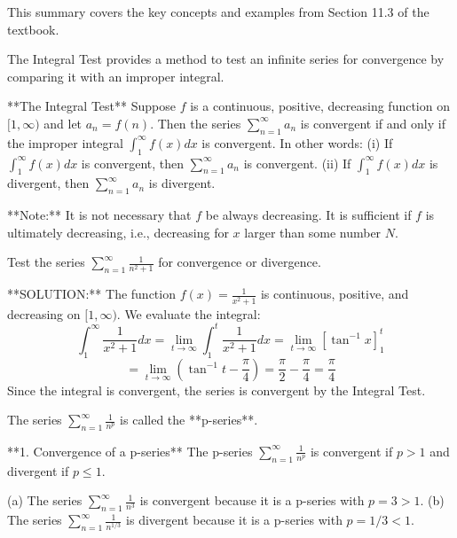 \documentclass[10pt]{book}
\begin{document}

This summary covers the key concepts and examples from Section 11.3 of the textbook.


The Integral Test provides a method to test an infinite series for convergence by comparing it with an improper integral.

**The Integral Test**
Suppose $f$ is a continuous, positive, decreasing function on $[1, \infty)$ and let $a_n = f(n)$. Then the series $\sum_{n=1}^{\infty} a_n$ is convergent if and only if the improper integral $\int_1^\infty f(x) dx$ is convergent. In other words:
(i) If $\int_1^\infty f(x) dx$ is convergent, then $\sum_{n=1}^{\infty} a_n$ is convergent.
(ii) If $\int_1^\infty f(x) dx$ is divergent, then $\sum_{n=1}^{\infty} a_n$ is divergent.

**Note:** It is not necessary that $f$ be always decreasing. It is sufficient if $f$ is ultimately decreasing, i.e., decreasing for $x$ larger than some number $N$.


Test the series $\sum_{n=1}^{\infty} \frac{1}{n^2 + 1}$ for convergence or divergence.

**SOLUTION:**
The function $f(x) = \frac{1}{x^2 + 1}$ is continuous, positive, and decreasing on $[1, \infty)$. We evaluate the integral:
$$
\int_1^\infty \frac{1}{x^2 + 1} dx = \lim_{t \to \infty} \int_1^t \frac{1}{x^2 + 1} dx = \lim_{t \to \infty} [\tan^{-1}x]_1^t
$$
$$
= \lim_{t \to \infty} (\tan^{-1}t - \frac{\pi}{4}) = \frac{\pi}{2} - \frac{\pi}{4} = \frac{\pi}{4}
$$
Since the integral is convergent, the series is convergent by the Integral Test.


The series $\sum_{n=1}^{\infty} \frac{1}{n^p}$ is called the **p-series**.

**1. Convergence of a p-series**
The p-series $\sum_{n=1}^{\infty} \frac{1}{n^p}$ is convergent if $p > 1$ and divergent if $p \le 1$.


(a) The series $\sum_{n=1}^{\infty} \frac{1}{n^3}$ is convergent because it is a p-series with $p=3 > 1$.
(b) The series $\sum_{n=1}^{\infty} \frac{1}{n^{1/3}}$ is divergent because it is a p-series with $p=1/3 < 1$.

\end{document}
